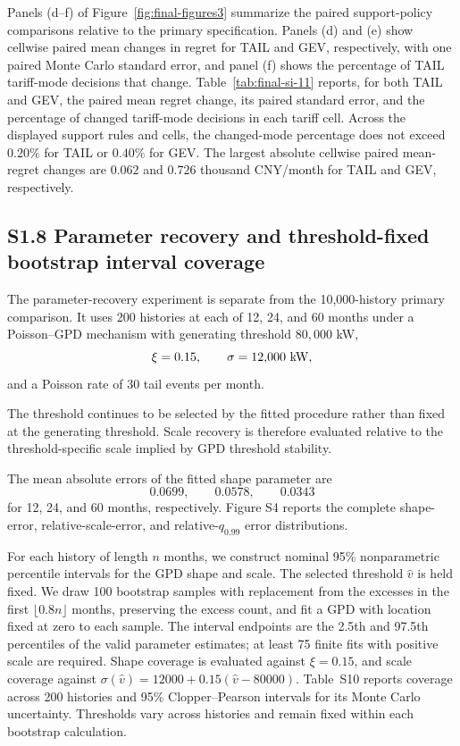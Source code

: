 \documentclass[AMA,Times1COL]{WileyNJDv5}
\begin{document}
Panels (d--f) of Figure~\ref{fig:final-figures3} summarize the paired
support-policy comparisons relative to the primary specification.
Panels (d) and (e) show cellwise paired mean changes in regret for TAIL
and GEV, respectively, with one paired Monte Carlo standard error, and
panel (f) shows the percentage of TAIL tariff-mode decisions that
change. Table~\ref{tab:final-si-11} reports, for both TAIL and GEV, the
paired mean regret change, its paired standard error, and the percentage
of changed tariff-mode decisions in each tariff cell. Across the
displayed support rules and cells, the changed-mode percentage does not
exceed \(0.20\%\) for TAIL or \(0.40\%\) for GEV. The largest absolute
cellwise paired mean-regret changes are \(0.062\) and \(0.726\) thousand
CNY/month for TAIL and GEV, respectively.


\subsection*{S1.8 Parameter recovery and threshold-fixed bootstrap interval coverage}


The parameter-recovery experiment is separate from the 10,000-history
primary comparison. It uses 200 histories at each of 12, 24, and
60 months under a Poisson--GPD mechanism with generating threshold
\(80{,}000\) kW,
\[
\xi=0.15,
\qquad
\sigma=12{,}000\ {\rm kW},
\]
and a Poisson rate of 30 tail events per month.

The threshold continues to be selected by the fitted procedure rather
than fixed at the generating threshold. Scale recovery is therefore
evaluated relative to the threshold-specific scale implied by GPD
threshold stability.

The mean absolute errors of the fitted shape parameter are
\[
0.0699,\qquad
0.0578,\qquad
0.0343
\]
for 12, 24, and 60 months, respectively. Figure S4 reports the
complete shape-error, relative-scale-error, and relative-\(q_{0.99}\)
error distributions.

\FloatBarrier

For each history of length \(n\) months, we construct nominal 95\%
nonparametric percentile intervals for the GPD shape and scale.
The selected threshold \(\widehat v\) is held fixed. We draw 100
bootstrap samples with replacement from the excesses in the first
\(\lfloor0.8n\rfloor\) months, preserving the excess count, and fit
a GPD with location fixed at zero to each sample. The interval
endpoints are the 2.5th and 97.5th percentiles of the valid parameter
estimates; at least 75 finite fits with positive scale are required.
Shape coverage is evaluated against \(\xi=0.15\), and scale coverage
against \(\sigma(\widehat v)=12000+0.15(\widehat v-80000)\).
Table~S10 reports coverage across 200 histories and 95\%
Clopper--Pearson intervals for its Monte Carlo uncertainty.
Thresholds vary across histories and remain fixed within each
bootstrap calculation.
\end{document}
